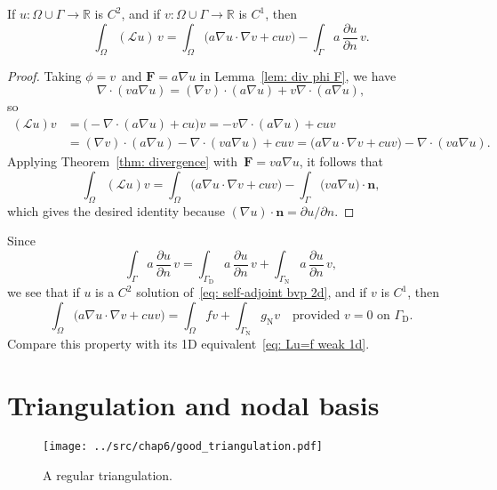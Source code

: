 \begin{theorem}\label{thm: first Green}
If $u:\Omega\cup\Gamma\to\mathbb{R}$ is $C^2$, and if 
$v:\Omega\cup\Gamma\to\mathbb{R}$ is $C^1$, then
\[
\int_\Omega(\mathcal{L}u)\,v
	=\int_\Omega\bigl(a\nabla u\cdot\nabla v+cuv\bigr)
	-\int_\Gamma a\,\frac{\partial u}{\partial n}\,v.
\]
\end{theorem}
\begin{proof}
Taking $\phi=v$~and $\boldsymbol{F}=a\nabla u$ in Lemma~\ref{lem: div phi F}, 
we have
\[
\nabla\cdot(va\nabla u)=(\nabla v)\cdot(a\nabla u)+v\nabla\cdot(a\nabla u),
\]
so
\begin{align*}
(\mathcal{L}u)v&=\bigl(-\nabla\cdot(a\nabla u)+cu\bigr)v
	=-v\nabla\cdot(a\nabla u)+cuv\\
	&=(\nabla v)\cdot(a\nabla u)-\nabla\cdot(va\nabla u)+cuv
	=\bigl(a\nabla u\cdot\nabla v+cuv)-\nabla\cdot(va\nabla u).
\end{align*}
Applying Theorem~\ref{thm: divergence} with~$\boldsymbol{F}=va\nabla u$, it 
follows that
\[
\int_\Omega(\mathcal{L}u)v=\int_\Omega\bigl(a\nabla u\cdot\nabla v+cuv\bigr)
	-\int_\Gamma\boldsymbol(va\nabla u)\cdot\boldsymbol{n},
\]
which gives the desired identity because 
$(\nabla u)\cdot\boldsymbol{n}=\partial u/\partial n$.
\end{proof}

Since 
\[
\int_\Gamma a\,\frac{\partial u}{\partial n}\,v
	=\int_{\Gamma_{\mathrm{D}}} a\,\frac{\partial u}{\partial n}\,v
	+\int_{\Gamma_{\mathrm{N}}} a\,\frac{\partial u}{\partial n}\,v,
\]
we see that if $u$ is a $C^2$ solution of~\eqref{eq: self-adjoint bvp 2d}, and 
if $v$ is $C^1$, then
\begin{equation}\label{eq: Lu=f weak 2d}
\int_\Omega\bigl(a\nabla u\cdot\nabla v+cuv\bigr)=\int_\Omega fv
	+\int_{\Gamma_{\mathrm{N}}}g_{\mathrm{N}}v
	\quad\text{provided $v=0$ on $\Gamma_{\mathrm{D}}$.}
\end{equation}
Compare this property with its 1D equivalent~\eqref{eq: Lu=f weak 1d}.

\section{Triangulation and nodal basis}\label{sec: triangulation}

\begin{figure}
\caption{A regular triangulation.}\label{fig: good Th}
\begin{center}
\texttt{[image: ../src/chap6/good\_triangulation.pdf]} 
\end{center}
\end{figure}

